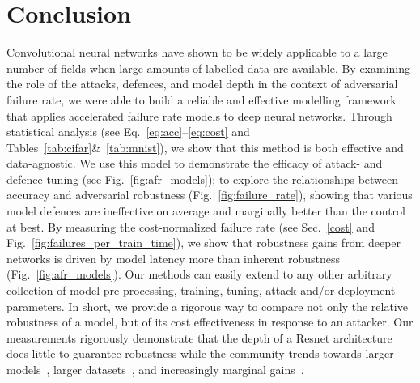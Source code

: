 \section{Conclusion}
Convolutional neural networks have shown to be widely applicable to a large number of fields when large amounts of labelled data are available. By examining the role of the attacks, defences, and model depth in the context of adversarial failure rate, we were able to build a reliable and effective modelling framework that applies accelerated failure rate models to deep neural networks. Through statistical analysis (see Eq.~\ref{eq:acc}--\ref{eq:cost} and Tables~\ref{tab:cifar}\&~\ref{tab:mnist}), we show that this method is both effective and data-agnostic.  We use this model to demonstrate the efficacy of attack- and defence-tuning (see Fig.~\ref{fig:afr_models}); to  explore the relationships between accuracy and adversarial robustness (Fig.~\ref{fig:failure_rate}), showing that various model defences are ineffective on average and marginally better than the control at best.
By measuring the cost-normalized failure rate (see Sec.~\ref{cost} and Fig.~\ref{fig:failures_per_train_time}), we show that robustness gains from deeper networks is driven by model latency more than inherent robustness (Fig.~\ref{fig:afr_models}). Our methods can easily extend to any other arbitrary collection of model pre-processing, training, tuning, attack and/or deployment parameters. In short, we provide a rigorous way to compare not only the relative robustness of a model, but of its cost effectiveness in response to an attacker. Our measurements rigorously demonstrate  that the depth of a Resnet architecture does little to guarantee robustness while the community trends towards larger models~\cite{desislavov2021compute}, larger datasets~\cite{desislavov2021compute,bailly2022effects}, and increasingly marginal gains~\cite{sun2017revisiting}.
